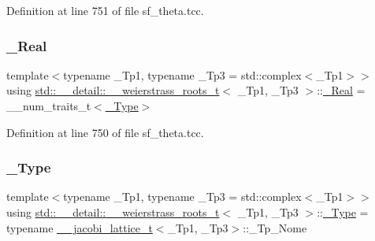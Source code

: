 Definition at line 751 of file sf\+\_\+theta.\+tcc.

\mbox{\label{structstd_1_1____detail_1_1____weierstrass__roots__t_a37df115993982e284c018276d175a53c}} 
\subsubsection{\texorpdfstring{\+\_\+\+Real}{\_Real}}
{\footnotesize\ttfamily template$<$typename \+\_\+\+Tp1, typename \+\_\+\+Tp3 = std\+::complex$<$\+\_\+\+Tp1$>$$>$ \\
using \hyperlink{structstd_1_1____detail_1_1____weierstrass__roots__t}{std\+::\+\_\+\+\_\+detail\+::\+\_\+\+\_\+weierstrass\+\_\+roots\+\_\+t}$<$ \+\_\+\+Tp1, \+\_\+\+Tp3 $>$\+::\hyperlink{structstd_1_1____detail_1_1____weierstrass__roots__t_a37df115993982e284c018276d175a53c}{\+\_\+\+Real} =  \+\_\+\+\_\+num\+\_\+traits\+\_\+t$<$\hyperlink{structstd_1_1____detail_1_1____weierstrass__roots__t_acda3e0386962aea322dea870977b67ed}{\+\_\+\+Type}$>$}



Definition at line 750 of file sf\+\_\+theta.\+tcc.

\mbox{\label{structstd_1_1____detail_1_1____weierstrass__roots__t_acda3e0386962aea322dea870977b67ed}} 
\subsubsection{\texorpdfstring{\+\_\+\+Type}{\_Type}}
{\footnotesize\ttfamily template$<$typename \+\_\+\+Tp1, typename \+\_\+\+Tp3 = std\+::complex$<$\+\_\+\+Tp1$>$$>$ \\
using \hyperlink{structstd_1_1____detail_1_1____weierstrass__roots__t}{std\+::\+\_\+\+\_\+detail\+::\+\_\+\+\_\+weierstrass\+\_\+roots\+\_\+t}$<$ \+\_\+\+Tp1, \+\_\+\+Tp3 $>$\+::\hyperlink{structstd_1_1____detail_1_1____weierstrass__roots__t_acda3e0386962aea322dea870977b67ed}{\+\_\+\+Type} =  typename \hyperlink{structstd_1_1____detail_1_1____jacobi__lattice__t}{\+\_\+\+\_\+jacobi\+\_\+lattice\+\_\+t}$<$\+\_\+\+Tp1, \+\_\+\+Tp3$>$\+::\+\_\+\+Tp\+\_\+\+Nome}



